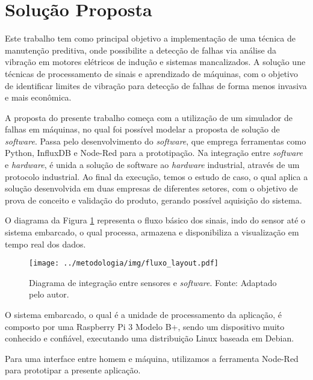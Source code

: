 \documentclass[a4paper]{ifacconf}
\begin{document}

\section{Solução Proposta}

Este trabalho tem como principal objetivo a implementação de uma técnica de manutenção preditiva, onde possibilite a detecção
de falhas via análise da vibração em motores elétricos de indução e sistemas mancalizados. A solução une técnicas de processamento de 
sinais e aprendizado de máquinas, com o objetivo de identificar limites de vibração para detecção de falhas de forma menos invasiva e mais
econômica. 

A proposta do presente trabalho começa com a utilização de um simulador de falhas em máquinas, no qual foi possível modelar a 
proposta de solução de \textit{software}. Passa pelo desenvolvimento do \textit{software}, que emprega ferramentas como Python, InfluxDB e 
Node-Red para a prototipação. 
Na integração entre \textit{software} e \textit{hardware}, é unida a solução de software ao \textit{hardware} industrial, através de um 
protocolo industrial. Ao final da execução, temos o estudo de caso, o qual aplica a solução desenvolvida em duas empresas de diferentes setores,
com o objetivo de prova de conceito e validação do produto, gerando possível aquisição do sistema. 

O diagrama da Figura \ref{fig:fluxo_integracao} representa o fluxo básico dos sinais, indo do sensor até o sistema embarcado, o qual processa, armazena e 
disponibiliza a visualização em tempo real dos dados.

\begin{figure}[H]
  \begin{center}
      \texttt{[image: ../metodologia/img/fluxo\_layout.pdf]}
  \end{center}
  \caption{Diagrama de integração  entre sensores e \textit{software}. Fonte: Adaptado pelo autor.}
  \label{fig:fluxo_integracao}
\end{figure}

O sistema embarcado, o qual é a unidade de processamento da aplicação, é composto por uma Raspberry Pi 3 Modelo B+, sendo um dispositivo muito 
conhecido e confiável, executando uma distribuição Linux baseada em Debian.

Para uma interface entre homem e máquina, utilizamos a ferramenta 
Node-Red para prototipar a presente aplicação.
\end{document}
